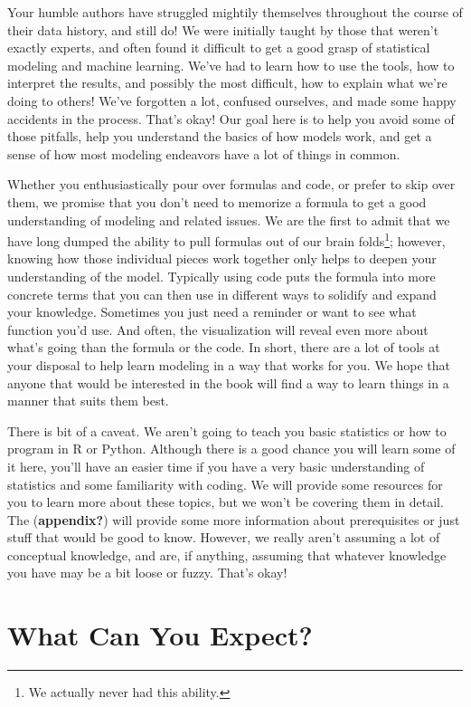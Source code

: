 \documentclass[
  letterpaper,
]{krantz}
\begin{document}
Your humble authors have struggled mightily themselves throughout the
course of their data history, and still do! We were initially taught by
those that weren't exactly experts, and often found it difficult to get
a good grasp of statistical modeling and machine learning. We've had to
learn how to use the tools, how to interpret the results, and possibly
the most difficult, how to explain what we're doing to others! We've
forgotten a lot, confused ourselves, and made some happy accidents in
the process. That's okay! Our goal here is to help you avoid some of
those pitfalls, help you understand the basics of how models work, and
get a sense of how most modeling endeavors have a lot of things in
common.

Whether you enthusiastically pour over formulas and code, or prefer to
skip over them, we promise that you don't need to memorize a formula to
get a good understanding of modeling and related issues. We are the
first to admit that we have long dumped the ability to pull formulas out
of our brain folds\footnote{We actually never had this ability.};
however, knowing how those individual pieces work together only helps to
deepen your understanding of the model. Typically using code puts the
formula into more concrete terms that you can then use in different ways
to solidify and expand your knowledge. Sometimes you just need a
reminder or want to see what function you'd use. And often, the
visualization will reveal even more about what's going than the formula
or the code. In short, there are a lot of tools at your disposal to help
learn modeling in a way that works for you. We hope that anyone that
would be interested in the book will find a way to learn things in a
manner that suits them best.

There is bit of a caveat. We aren't going to teach you basic statistics
or how to program in R or Python. Although there is a good chance you
will learn some of it here, you'll have an easier time if you have a
very basic understanding of statistics and some familiarity with coding.
We will provide some resources for you to learn more about these topics,
but we won't be covering them in detail. The (\textbf{appendix?}) will
provide some more information about prerequisites or just stuff that
would be good to know. However, we really aren't assuming a lot of
conceptual knowledge, and are, if anything, assuming that whatever
knowledge you have may be a bit loose or fuzzy. That's okay!

\section{What Can You Expect?}\label{what-can-you-expect}
\end{document}
